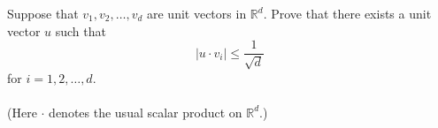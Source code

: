 \documentclass{article}
\begin{document}
\setlength{\parindent}{0pt}
Suppose that \( v_1, v_2, \dots, v_d \) are unit vectors in \( \mathbb{R}^d \). Prove that there exists a unit vector \( u \) such that
\[
|u \cdot v_i| \leq \frac{1}{\sqrt{d}}
\]
for \( i = 1, 2, \dots, d \).\\
\;\\
(Here \( \cdot \) denotes the usual scalar product on \( \mathbb{R}^d \).)

\end{document}
